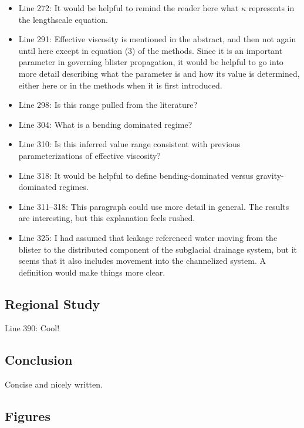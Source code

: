 \documentclass[11pt]{article}
\begin{document}
\begin{itemize}[leftmargin=*]
\item Line 272: It would be helpful to remind the reader here what $\kappa$ represents in the lengthscale
equation.

\item Line 291: Effective viscosity is mentioned in the abstract, and then not again until here except in
equation (3) of the methods. Since it is an important parameter in governing blister propagation,
it would be helpful to go into more detail describing what the parameter is and how its value is
determined, either here or in the methods when it is first introduced.

\item Line 298: Is this range pulled from the literature?

\item Line 304: What is a bending dominated regime?

\item Line 310: Is this inferred value range consistent with previous parameterizations of effective
viscosity?

\item Line 318: It would be helpful to define bending-dominated versus gravity-dominated regimes.

\item Line 311--318: This paragraph could use more detail in general. The results are interesting, but
this explanation feels rushed.

\item Line 325: I had assumed that leakage referenced water moving from the blister to the distributed
component of the subglacial drainage system, but it seems that it also includes movement into
the channelized system. A definition would make things more clear.
\end{itemize}

\subsection*{Regional Study}

Line 390: Cool!

\subsection*{Conclusion}

Concise and nicely written.

\subsection*{Figures}
\end{document}
